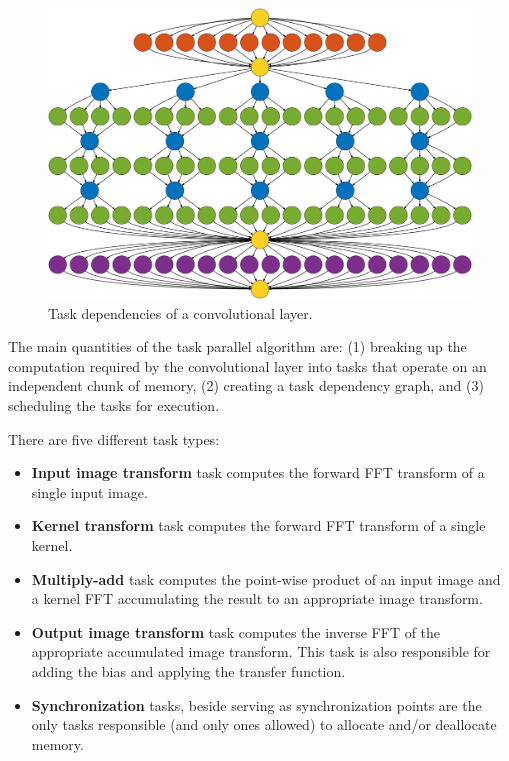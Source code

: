 \documentclass[conference]{./IEEEtran/IEEEtran}
\begin{document}
  \begin{figure}
    \begin{center}
      \includegraphics[width=0.95\columnwidth]{fig/deps}
    \end{center}
    \caption{Task dependencies of a convolutional layer.}
    \label{fig:task_deps}
  \end{figure}

  The main quantities of the task parallel algorithm are: (1) breaking
  up the computation required by the convolutional layer into tasks
  that operate on an independent chunk of memory, (2) creating a task
  dependency graph, and (3) scheduling the tasks for execution.

  There are five different task types:

  \begin{itemize}
    \item {\color{zred}\bf Input image transform} task computes the
      forward FFT transform of a single input image.
    \item {\color{zblue}\bf Kernel transform} task computes the forward
      FFT transform of a single kernel.
    \item {\color{zgreen}\bf Multiply-add} task computes the
      point-wise product of an input image and a kernel FFT
      accumulating the result to an appropriate image transform.
    \item {\color{zpurple}\bf Output image transform} task computes
      the inverse FFT of the appropriate accumulated image transform.
      This task is also responsible for adding the bias and applying
      the transfer function.
    \item {\color{zyellow}\bf Synchronization} tasks, beside serving
      as synchronization points are the only tasks responsible (and
      only ones allowed) to allocate and/or deallocate memory.
  \end{itemize}
\end{document}
